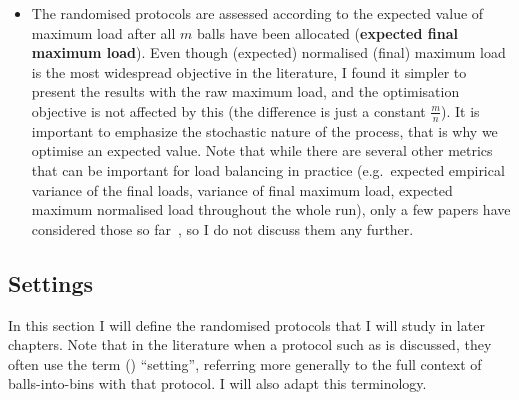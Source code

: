 \begin{itemize}
    \item
    The randomised protocols are assessed according to the expected value of maximum load after all $m$ balls have been allocated (\textbf{expected final maximum load}). Even though (expected) normalised (final) maximum load is the most widespread objective in the literature, I found it simpler to present the results with the raw maximum load, and the optimisation objective is not affected by this (the difference is just a constant $\frac{m}{n}$). It is important to emphasize the stochastic nature of the process, that is why we optimise an expected value. Note that while there are several other metrics that can be important for load balancing in practice (e.g.\ expected empirical variance of the final loads, variance of final maximum load, expected maximum normalised load throughout the whole run), only a few papers have considered those so far~\cite{feldheim2021longtermthinning}, so I do not discuss them any further. 
    
\end{itemize}





\subsection{Settings} \label{settings}

In this section I will define the randomised protocols that I will study in later chapters. Note that in the literature when a protocol such as \TwoThinning is discussed, they often use the term (\TwoThinning) ``setting'', referring more generally to the full context of balls-into-bins with that protocol. I will also adapt this terminology.

